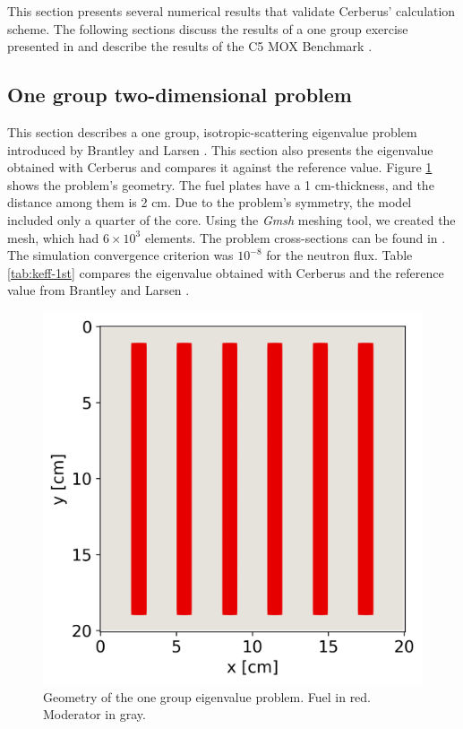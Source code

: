\documentclass{anstrans}
\begin{document}
This section presents several numerical results that validate Cerberus' calculation scheme.
The following sections discuss the results of a one group exercise presented in \cite{brantley_simplifiedP3_2000} and describe the results of the C5 MOX Benchmark \cite{cavarec_benchmark_1994}.

\subsection{One group two-dimensional problem}

This section describes a one group, isotropic-scattering eigenvalue problem introduced by Brantley and Larsen \cite{brantley_simplifiedP3_2000}.
This section also presents the eigenvalue obtained with Cerberus and compares it against the reference value.
Figure \ref{fig:2D} shows the problem's geometry.
The fuel plates have a 1 cm-thickness, and the distance among them is 2 cm.
Due to the problem's symmetry, the model included only a quarter of the core.
Using the \textit{Gmsh} \cite{geuzaine_gmsh_2009} meshing tool, we created the mesh, which had $6 \times 10^{3}$ elements.
The problem cross-sections can be found in \cite{brantley_simplifiedP3_2000}.
The simulation convergence criterion was $10^{-8}$ for the neutron flux.
Table \ref{tab:keff-1st} compares the eigenvalue obtained with Cerberus and the reference value from Brantley and Larsen \cite{brantley_simplifiedP3_2000}.

\begin{figure}[htbp!] %
    \centering
    \includegraphics[width=0.55\linewidth]{figures/mesh2.png}
    \hfill
    \caption{Geometry of the one group eigenvalue problem. Fuel in red. Moderator in gray.}
    \label{fig:2D}
\end{figure}
\end{document}
